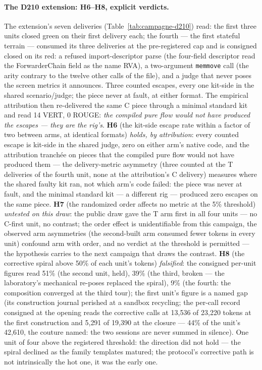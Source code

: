 \documentclass[11pt,a4paper]{article}
\newcommand{\code}[1]{\texttt{\small #1}}
\begin{document}
\paragraph{The D210 extension: H6--H8, explicit verdicts.} The
extension's seven deliveries (Table~\ref{tab:campagne-d210}) read:
the first three units closed green on their first delivery each; the
fourth --- the first stateful terrain --- consumed its three
deliveries at the pre-registered cap and is consigned closed on its
red: a refused import-descriptor parse (the four-field descriptor
read the ForwarderChain field as the name RVA), a two-argument
\code{memmove} call (the arity contrary to the twelve other calls of
the file), and a judge that never poses the screen metrics it
announces. Three counted escapes, every one kit-side in the shared
scenario/judge; the piece never at fault, at either format. The
empirical attribution then re-delivered the same C piece through a
minimal standard kit and read 14 VERT, 0 ROUGE: \emph{the compiled
pure flow would not have produced the escapes --- they are the
rig's}. \textbf{H6} (the kit-side escape rate within a factor of two
between arms, at identical formats) \emph{holds, by attribution}:
every counted escape is kit-side in the shared judge, zero on either
arm's native code, and the attribution tranch\'ee on pieces that the
compiled pure flow would not have produced them --- the
delivery-metric asymmetry (three counted at the T deliveries of the
fourth unit, none at the attribution's C delivery) measures where the
shared faulty kit ran, not which arm's code failed: the piece was
never at fault, and the minimal standard kit --- a different rig ---
produced zero escapes on the same piece. \textbf{H7} (the randomized
order affects no metric at the 5\% threshold) \emph{untested on this
draw}: the public draw gave the T arm first in all four units --- no
C-first unit, no contrast; the order effect is unidentifiable from
this campaign, the observed arm asymmetries (the second-built arm
consumed fewer tokens in every unit) confound arm with order, and no
verdict at the threshold is permitted --- the hypothesis carries to
the next campaign that draws the contrast. \textbf{H8} (the
corrective spiral above 50\% of each unit's tokens) \emph{falsified}:
the consigned per-unit figures read 51\% (the second unit, held),
39\% (the third, broken --- the laboratory's mechanical re-poses
replaced the spiral), 9\% (the fourth: the composition converged at
the third tour); the first unit's figure is a named gap (its
construction journal perished at a sandbox recycling; the per-call
record consigned at the opening reads the corrective calls at
13{,}536 of 23{,}220 tokens at the first construction and 5{,}291 of
19{,}390 at the closure --- 44\% of the unit's 42{,}610, the couture
named: the two sessions are never summed in silence). One unit of
four above the registered threshold: the direction did not hold ---
the spiral declined as the family templates matured; the protocol's
corrective path is not intrinsically the hot one, it was the early
one.
\end{document}
